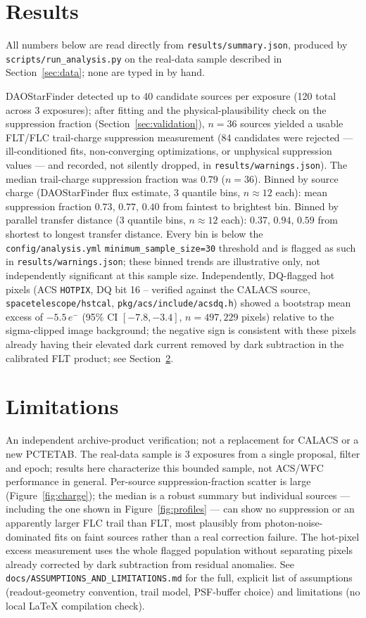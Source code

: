\documentclass[11pt]{article}
\begin{document}
\section{Results}
\label{sec:results}
All numbers below are read directly from \texttt{results/summary.json},
produced by \texttt{scripts/run\_analysis.py} on the real-data sample
described in Section~\ref{sec:data}; none are typed in by hand.

DAOStarFinder detected up to 40 candidate sources per exposure (120 total
across 3 exposures); after fitting and the physical-plausibility check on the
suppression fraction (Section~\ref{sec:validation}), $n=36$ sources yielded a
usable FLT/FLC trail-charge suppression measurement (84 candidates were
rejected --- ill-conditioned fits, non-converging optimizations, or
unphysical suppression values --- and recorded, not silently dropped, in
\texttt{results/warnings.json}). The median trail-charge suppression fraction
was $0.79$ ($n=36$). Binned by source charge (DAOStarFinder flux estimate,
3 quantile bins, $n\approx12$ each): mean suppression fraction $0.73$, $0.77$,
$0.40$ from faintest to brightest bin. Binned by parallel transfer distance
(3 quantile bins, $n\approx12$ each): $0.37$, $0.94$, $0.59$ from shortest to
longest transfer distance. Every bin is below the
\texttt{config/analysis.yml} \texttt{minimum\_sample\_size=30} threshold and
is flagged as such in \texttt{results/warnings.json}; these binned trends are
illustrative only, not independently significant at this sample size.
Independently, DQ-flagged hot pixels (ACS \texttt{HOTPIX}, DQ bit 16 --
verified against the CALACS source, \texttt{spacetelescope/hstcal},
\texttt{pkg/acs/include/acsdq.h}) showed a bootstrap mean excess of
$-5.5\,e^-$ (95\% CI $[-7.8, -3.4]$, $n=497{,}229$ pixels) relative to the
sigma-clipped image background; the negative sign is consistent with these
pixels already having their elevated dark current removed by dark
subtraction in the calibrated FLT product; see
Section~\ref{sec:limitations}.

\section{Limitations}
\label{sec:limitations}
An independent archive-product verification; not a replacement for CALACS or
a new PCTETAB. The real-data sample is 3 exposures from a single proposal,
filter and epoch; results here characterize this bounded sample, not ACS/WFC
performance in general. Per-source suppression-fraction scatter is large
(Figure~\ref{fig:charge}); the median is a robust summary but individual
sources --- including the one shown in Figure~\ref{fig:profiles} --- can show
no suppression or an apparently larger FLC trail than FLT, most plausibly
from photon-noise-dominated fits on faint sources rather than a real
correction failure. The hot-pixel excess measurement uses the whole flagged
population without separating pixels already corrected by dark subtraction
from residual anomalies. See \texttt{docs/ASSUMPTIONS\_AND\_LIMITATIONS.md}
for the full, explicit list of assumptions (readout-geometry convention,
trail model, PSF-buffer choice) and limitations (no local LaTeX compilation
check).
\end{document}
